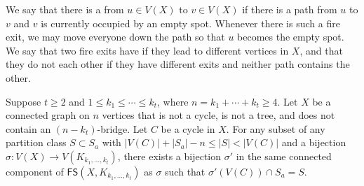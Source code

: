 \documentclass{mystyle}
\newcommand{\FS}{\mathsf{FS}}
\begin{document}
We say that there is a  from $u \in V(X)$ to $v \in V(X)$ if there is a path from $u$ to $v$ and $v$ is currently occupied by an empty spot. Whenever there is such a fire exit, we may move everyone down the path so that $u$ becomes the empty spot. We say that two fire exits have  if they lead to different vertices in $X$, and that they do not  each other if they have different exits and neither path contains the other. 
\begin{proposition}\label{prop_populate_cycle}
    Suppose $t \geq 2$ and $1 \leq k_1 \leq \cdots \leq k_t$, where $n = k_1 + \cdots + k_t \geq 4$. Let $X$ be a connected graph on $n$ vertices that is not a cycle, is not a tree, and does not contain an $(n - k_{t})$-bridge. Let $C$ be a cycle in $X$. For any subset of any partition class $S \subset S_a$ with $|V(C)| + |S_a| - n \leq |S| < |V(C)|$ and a bijection $\sigma: V(X) \to V(K_{k_1, \ldots, k_t})$, there exists a bijection $\sigma'$ in the same connected component of $\FS(X, K_{k_1, \ldots, k_t})$ as $\sigma$ such that $\sigma'(V(C)) \cap S_a = S$. 
\end{proposition}
\end{document}
